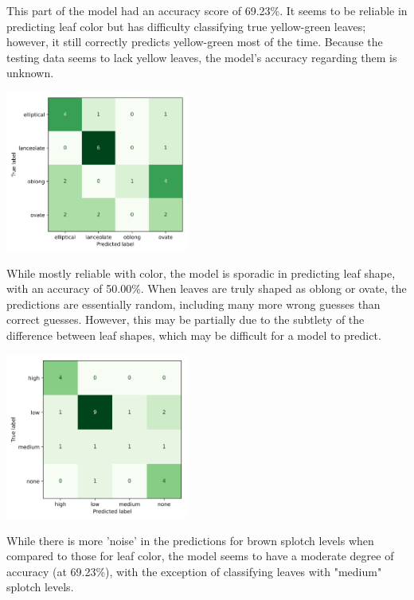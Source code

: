 \documentclass[final,5p,times,twocolumn,authoryear]{elsarticle}
\begin{document}
This part of the model had an accuracy score of 69.23\%. It seems to be reliable in predicting leaf color but has difficulty classifying true yellow-green leaves; however, it still correctly predicts yellow-green most of the time. Because the testing data seems to lack yellow leaves, the model's accuracy regarding them is unknown.

\begin{center}
    \includegraphics[width=0.45\textwidth]{images/morph_conf_matrix/shape.png}
\end{center}

While mostly reliable with color, the model is sporadic in predicting leaf shape, with an accuracy of 50.00\%. When leaves are truly shaped as oblong or ovate, the predictions are essentially random, including many more wrong guesses than correct guesses. However, this may be partially due to the subtlety of the difference between leaf shapes, which may be difficult for a model to predict.

\begin{center}
    \includegraphics[width=0.45\textwidth]{images/morph_conf_matrix/splotch.png}
\end{center}

While there is more 'noise' in the predictions for brown splotch levels when compared to those for leaf color, the model seems to have a moderate degree of accuracy (at 69.23\%), with the exception of classifying leaves with "medium" splotch levels. 
\end{document}
